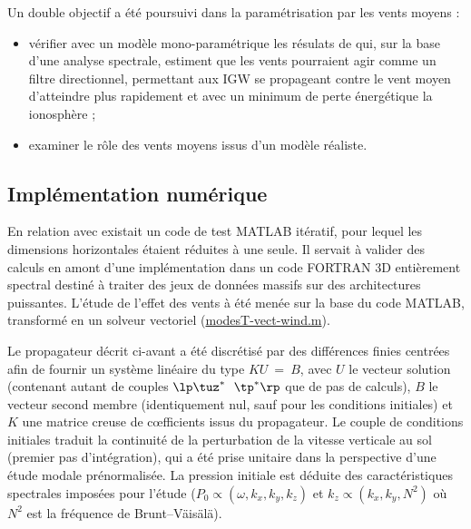 
Un double objectif a été poursuivi dans la paramétrisation par les vents moyens :
\begin{itemize}
    \item vérifier avec un modèle mono-paramétrique les résulats de \cite{Sun2007} qui, sur la base d'une analyse spectrale, estiment que les vents pourraient agir comme un filtre directionnel, permettant aux IGW se propageant contre le vent moyen d'atteindre plus rapidement et avec un minimum de perte énergétique la ionosphère ;
    \item examiner le rôle des vents moyens issus d'un modèle réaliste.
\end{itemize}

\subsection{Implémentation numérique}

En relation avec \cite{Occhipinti2008} existait un code de test MATLAB itératif, pour lequel les dimensions horizontales étaient réduites à une seule. Il servait à valider des calculs en amont d'une implémentation dans un code FORTRAN 3D entièrement spectral destiné à traiter des jeux de données massifs sur des architectures puissantes. L'étude de l'effet des vents à été menée sur la base du code MATLAB, transformé en un solveur vectoriel (\hyperref{annexe:A:modesTvectwind.m}{}{}{modesT-vect-wind.m}).

Le propagateur décrit ci-avant a été discrétisé par des différences finies centrées afin de fournir un système linéaire du type $KU~=~B$, avec $U$ le vecteur solution (contenant autant de couples $\lp \tuz^*~~\tp^* \rp$ que de pas de calculs), $B$ le vecteur second membre (identiquement nul, sauf pour les conditions initiales) et $K$ une matrice creuse de cœfficients issus du propagateur. Le couple de conditions initiales traduit la continuité de la perturbation de la vitesse verticale au sol (premier pas d'intégration), qui a été prise unitaire dans la perspective d'une étude modale prénormalisée. La pression initiale est déduite des caractéristiques spectrales imposées pour l'étude ($P_0 \propto (\omega, k_x, k_y, k_z)$ et $k_z \propto (k_x, k_y, N^2)$ où $N^2$ est la fréquence de Brunt–Väisälä).


